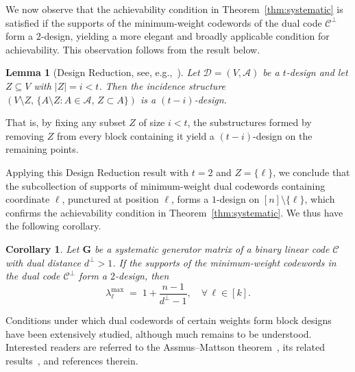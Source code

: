 \documentclass[conference,letterpaper]{IEEEtran}
\newtheorem{corollary}{Corollary}%
\newtheorem{lemma}{Lemma}
\begin{document}
\medskip

We now observe that the achievability condition in Theorem~\ref{thm:systematic} is satisfied if the supports of the minimum-weight codewords of the dual code $\mathcal{C^{\perp}}$ form a \( 2 \)-design, yielding a more elegant and broadly applicable condition for achievability. This observation follows from the result below.

\begin{lemma}[Design Reduction, see, e.g.,{~\cite[Theorem 9.2]{CombiDesigns:books/daglib/Stinson04}}]
Let \( \mathcal{D} = (V, \mathcal{A}) \) be a \( t \)-design and let \( Z \subseteq V \) with \( |Z| = i < t \). Then the incidence structure \( (V \setminus Z,\, \{A \setminus Z : A \in \mathcal{A},\, Z \subset A\}) \) is a \( (t - i) \)-design.
\end{lemma}
That is, by fixing any subset \( Z \) of size \( i < t \), the substructures formed by removing \( Z \) from every block containing it yield a \( (t-i) \)-design on the remaining points.


Applying this Design Reduction result with \( t = 2 \) and \( Z = \{\ell\} \), we conclude that the subcollection of supports of minimum-weight dual codewords containing coordinate \( \ell \), punctured at position \( \ell \), forms a \( 1 \)-design on \( [n] \setminus \{\ell\} \), which confirms the achievability condition in Theorem~\ref{thm:systematic}. We thus have the following corollary.
\begin{corollary}\label{coro:2desgin}
Let \( \boldsymbol{G} \) be a systematic generator matrix of a binary linear code $\mathcal{C}$ with dual distance \( d^\perp > 1 \). If the supports of the minimum-weight codewords in the dual code \( \mathcal{C}^\perp \) form a \( 2 \)-design, then
\[
\lambda_{\ell}^{\max} \;=\; 1 + \frac{n - 1}{d^\perp - 1}, \quad \forall\, \ell \in [k].
\]
\end{corollary}
Conditions under which dual codewords of certain weights form block designs have been extensively studied, although much remains to be understood. Interested readers are referred to the Assmus--Mattson theorem~\cite{5_designs:journals/joct/AssusH69}, its related results~\cite{combinatorial_design:journals/tit/CalderbankDS91}, and references therein.
\end{document}
